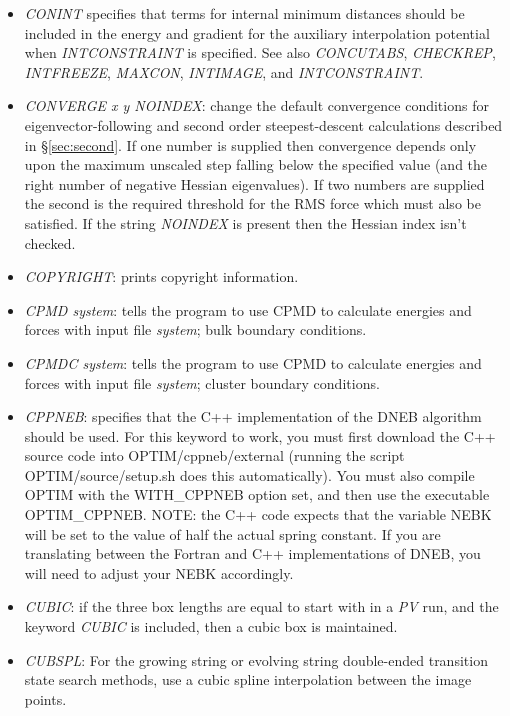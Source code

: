 \documentclass[12pt,a4paper,dvips]{article}
\begin{document}
\begin{itemize}
\item{\it CONINT\/} specifies that terms for internal minimum distances
should be included in the energy and gradient for the auxiliary interpolation
potential when {\it INTCONSTRAINT\/} is specified. See also
{\it CONCUTABS\/},
{\it CHECKREP\/},
{\it INTFREEZE\/},
{\it MAXCON\/},
{\it INTIMAGE\/}, and
{\it INTCONSTRAINT\/}.

\item {\it CONVERGE x y NOINDEX\/}: change the default convergence conditions
for eigenvector-following and second order steepest-descent calculations 
described in \S\ref{sec:second}. If one number is supplied then convergence depends only upon
the maximum unscaled step falling below the specified value (and the right number
of negative Hessian eigenvalues). If two numbers are supplied the second is the 
required threshold for the RMS force which must also be satisfied.
If the string {\it NOINDEX\/} is present then the Hessian index isn't checked.

\item {\it COPYRIGHT\/}: prints copyright information.

\item {\it CPMD system\/}: tells the program to use CPMD to calculate energies and
forces with input file {\it system\/}; bulk boundary conditions.

\item {\it CPMDC system\/}: tells the program to use CPMD to calculate energies and
forces with input file {\it system\/}; cluster boundary conditions.

\item {\it CPPNEB\/}: specifies that the C++ implementation of the DNEB algorithm should be used. For this keyword to work, you must first download the C++ source code into OPTIM/cppneb/external (running the script OPTIM/source/setup.sh does this automatically). You must also compile OPTIM with the WITH\_CPPNEB option set, and then use the executable OPTIM\_CPPNEB. NOTE: the C++ code expects that the variable NEBK will be set to the value of half the actual spring constant. If you are translating between the Fortran and C++ implementations of DNEB, you will need to adjust your NEBK accordingly.

\item {\it CUBIC\/}: if the three box lengths are equal to start with in a {\it PV\/} run,
and the keyword {\it CUBIC \/} is included, then a cubic box is maintained. 

\item {\it CUBSPL\/}: For the growing string or evolving string double-ended
  transition state search methods, use a cubic spline interpolation between
  the image points.


\end{itemize}
\end{document}
